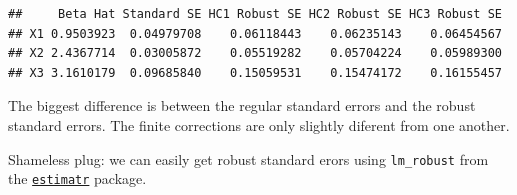 \documentclass[]{article}
\newenvironment{Shaded}{\begin{snugshade}}{\end{snugshade}}
\newcommand{\CommentTok}[1]{\textcolor[rgb]{0.56,0.35,0.01}{\textit{#1}}}
\newcommand{\DataTypeTok}[1]{\textcolor[rgb]{0.13,0.29,0.53}{#1}}
\newcommand{\DecValTok}[1]{\textcolor[rgb]{0.00,0.00,0.81}{#1}}
\newcommand{\KeywordTok}[1]{\textcolor[rgb]{0.13,0.29,0.53}{\textbf{#1}}}
\newcommand{\NormalTok}[1]{#1}
\newcommand{\OperatorTok}[1]{\textcolor[rgb]{0.81,0.36,0.00}{\textbf{#1}}}
\newcommand{\StringTok}[1]{\textcolor[rgb]{0.31,0.60,0.02}{#1}}
\begin{document}
\begin{Shaded}
\end{Shaded}

\begin{verbatim}
##     Beta Hat Standard SE HC1 Robust SE HC2 Robust SE HC3 Robust SE
## X1 0.9503923  0.04979708    0.06118443    0.06235143    0.06454567
## X2 2.4367714  0.03005872    0.05519282    0.05704224    0.05989300
## X3 3.1610179  0.09685840    0.15059531    0.15474172    0.16155457
\end{verbatim}

The biggest difference is between the regular standard errors and the
robust standard errors. The finite corrections are only slightly
diferent from one another.

Shameless plug: we can easily get robust standard erors using
\texttt{lm\_robust} from the
\href{https://declaredesign.org/r/estimatr/}{\texttt{estimatr}} package.
\end{document}
